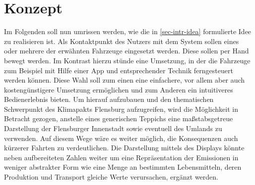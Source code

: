 \documentclass[.../Dokumentation.tex]{subfiles}
\begin{document}
\section{Konzept}\label{sec-concept}
Im Folgenden soll nun umrissen werden, wie die in \ref{sec-intr-idea} 
formulierte Idee zu realisieren ist.
Als Kontaktpunkt des Nutzers mit dem System sollen eines oder mehrere 
der erwähnten Fahrzeuge eingesetzt werden. Diese sollen per Hand bewegt werden. 
Im Kontrast hierzu stünde eine Umsetzung, in der die Fahrzeuge zum Beispiel mit 
Hilfe einer App und entsprechender Technik ferngesteuert werden können.
Diese Wahl soll zum einen eine einfachere, vor allem aber auch kostengünstigere 
Umsetzung ermöglichen und zum Anderen ein intuitiveres Bedienerlebnis bieten.
Um hierauf aufzubauen und den thematischen Schwerpunkt des Klimapakts Flensburg 
aufzugreifen, wird die Möglichkeit in Betracht gezogen, anstelle 
eines generischen Teppichs eine maßstabsgetreue Darstellung der Flensburger 
Innenstadt sowie eventuell des Umlands zu verwenden.
Auf diesem Wege wäre es weiter möglich, die Konsequenzen auch kürzerer Fahrten 
zu verdeutlichen.
Die Darstellung mittels des Displays könnte neben aufbereiteten Zahlen weiter 
um eine Repräsentation der Emissionen in weniger abstrakter Form wie eine 
Menge an bestimmten Lebensmitteln, deren Produktion und Transport gleiche Werte 
verursachen, ergänzt werden.
\end{document}
